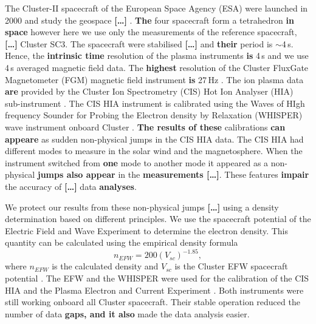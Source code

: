\documentclass[linenumbers,draft]{agujournal}
\begin{document}
The Cluster-II spacecraft of the European Space Agency (ESA) were launched in 2000 and study the geospace \textbf{[\dots]} \citep{credland97:_clust_mission,escoubet01:_introd_clust}. \textbf{The} four spacecraft form a tetrahedron \textbf{in space} however here we use only the measurements of the reference spacecraft, \textbf{[\dots]} Cluster SC3. The spacecraft were stabilised \textbf{[\dots]} and \textbf{their} period is $\sim$4\,s. Hence, the \textbf{intrinsic time} resolution of the plasma instruments \textbf{is} 4\,s and we use 4\,s averaged magnetic field data. The \textbf{highest} resolution of the Cluster FluxGate Magnetometer (FGM) magnetic field instrument \textbf{is} 27\,Hz \citep{balogh97:_clust_magnet_field_inves,balogh01:_clust_magnet_field_inves}. The ion plasma data \textbf{are} provided by the Cluster Ion Spectrometry (CIS) Hot Ion Analyser (HIA) sub-instrument \citep{reme97:_clust_ion_spect_exper,reme01:_first_earth_clust_cis}. The CIS HIA instrument is calibrated using the Waves of HIgh frequency Sounder for Probing the Electron density by Relaxation (WHISPER) wave instrument onboard Cluster \citep{decreau01:_early_whisp_clust,trotignon10:_whisp_relax_sound_clust_activ_archiv,blagau13:_in_hot_ion_analy_clust,blagau14:_in_hot_ion_analy_clust}. \textbf{The results of these} calibrations \textbf{can appeare} as sudden non-physical jumps in the CIS HIA data. The CIS HIA had different modes to measure in the solar wind and the magnetosphere. When the instrument switched from \textbf{one} mode to another mode it appeared as a non-physical \textbf{jumps also appear} in the \textbf{measurements [\dots]}. These features \textbf{impair} the accuracy of \textbf{[\dots]} data \textbf{analyses}.

We protect our results from these non-physical jumps \textbf{[\dots]} using a density determination based on different principles. We use the spacecraft potential of the Electric Field and Wave Experiment \citep[EFW ;][]{gustafsson97:_elect_field_wave_exper_clust_mission,gustafsson01:_first_clust_efw} to determine the electron density. This quantity can be calculated using the empirical density formula 
\begin{equation}\label{eq:empdens}
n_{EFW}=200(V_{sc})^{-1.85},
\end{equation}
where $n_{EFW}$ is the calculated density and $V_{sc}$ is the Cluster EFW spacecraft potential \citep{trotignon10:_whisp_relax_sound_clust_activ_archiv,trotignon11:_calib_repor_whisp_measur_clust}. The EFW and the WHISPER were used for the calibration of the CIS HIA and the Plasma Electron and Current Experiment \citep[PEACE;][]{johnstone97:_peace,fazakerley10:_peace_data_clust_activ_archiv,fazakerley10:_clust_peace_in_calib_status}. Both instruments were still working onboard all Cluster spacecraft. Their stable operation reduced the number of data \textbf{gaps, and it also} made the data analysis easier.
\end{document}
